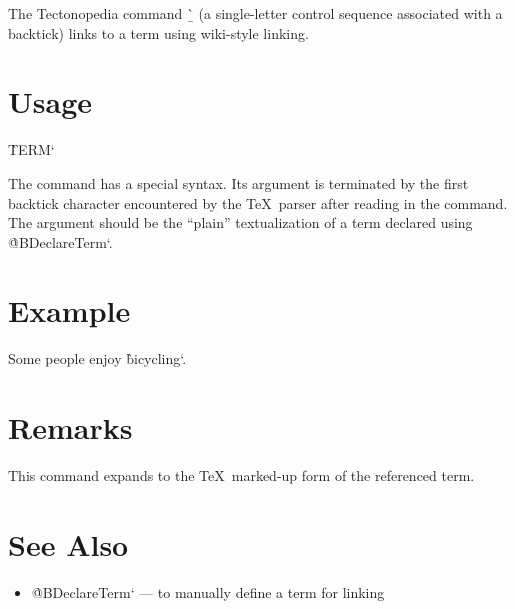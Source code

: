 
The Tectonopedia command \b{\string\`} (a single-letter control sequence
associated with a backtick) links to a term using wiki-style linking.

\section*{Usage}

\begin{texdisp}
\`TERM`
\end{texdisp}

The command has a special syntax. Its argument is terminated by the first
backtick character encountered by the \TeX\ parser after reading in the command.
The argument should be the “plain” textualization of a term declared using
\`@BDeclareTerm`.

\section*{Example}

\begin{texdisp}

Some people enjoy \`bicycling`.
\end{texdisp}

\section*{Remarks}

This command expands to the \TeX\ marked-up form of the referenced term.

\section*{See Also}

\begin{itemize}
\item \`@BDeclareTerm` — to manually define a term for linking
\end{itemize}